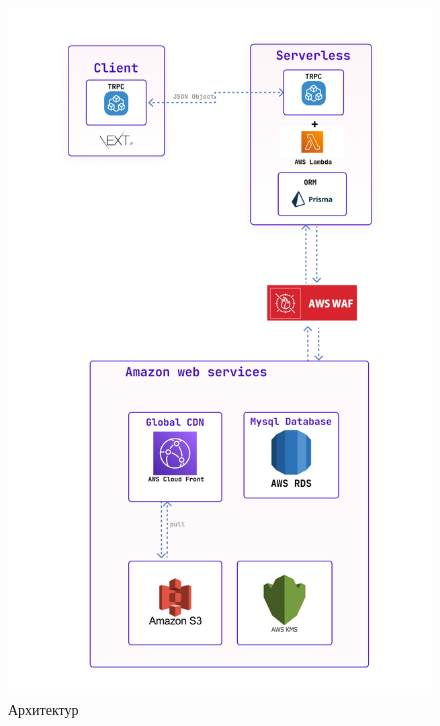 \begin{figure}[h!]
	\centering
	\includegraphics[scale=0.33]{assets/server.png}
	\caption{Архитектур}
	\label{fig:architecture}
\end{figure}
\break
\newpage


